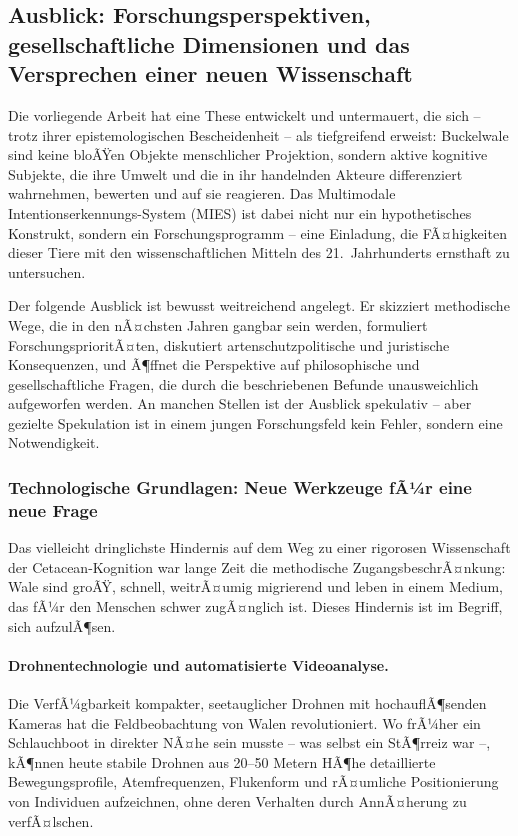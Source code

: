 ﻿\documentclass[12pt,a4paper]{article}
\theoremstyle{definition}
\theoremstyle{remark}
\begin{document}
\subsection{Ausblick: Forschungsperspektiven, gesellschaftliche Dimensionen und das Versprechen einer neuen Wissenschaft}
\label{sec:ausblick}

Die vorliegende Arbeit hat eine These entwickelt und untermauert, die sich -- trotz ihrer epistemologischen Bescheidenheit -- als tiefgreifend erweist: Buckelwale sind keine bloÃŸen Objekte menschlicher Projektion, sondern aktive kognitive Subjekte, die ihre Umwelt und die in ihr handelnden Akteure differenziert wahrnehmen, bewerten und auf sie reagieren. Das Multimodale Intentionserkennungs-System (MIES) ist dabei nicht nur ein hypothetisches Konstrukt, sondern ein Forschungsprogramm -- eine Einladung, die FÃ¤higkeiten dieser Tiere mit den wissenschaftlichen Mitteln des 21.\ Jahrhunderts ernsthaft zu untersuchen.

Der folgende Ausblick ist bewusst weitreichend angelegt. Er skizziert methodische Wege, die in den nÃ¤chsten Jahren gangbar sein werden, formuliert ForschungsprioritÃ¤ten, diskutiert artenschutzpolitische und juristische Konsequenzen, und Ã¶ffnet die Perspektive auf philosophische und gesellschaftliche Fragen, die durch die beschriebenen Befunde unausweichlich aufgeworfen werden. An manchen Stellen ist der Ausblick spekulativ -- aber gezielte Spekulation ist in einem jungen Forschungsfeld kein Fehler, sondern eine Notwendigkeit.

\subsubsection{Technologische Grundlagen: Neue Werkzeuge fÃ¼r eine neue Frage}

Das vielleicht dringlichste Hindernis auf dem Weg zu einer rigorosen Wissenschaft der Cetacean-Kognition war lange Zeit die methodische ZugangsbeschrÃ¤nkung: Wale sind groÃŸ, schnell, weitrÃ¤umig migrierend und leben in einem Medium, das fÃ¼r den Menschen schwer zugÃ¤nglich ist. Dieses Hindernis ist im Begriff, sich aufzulÃ¶sen.

\paragraph{Drohnentechnologie und automatisierte Videoanalyse.}
Die VerfÃ¼gbarkeit kompakter, seetauglicher Drohnen mit hochauflÃ¶senden Kameras hat die Feldbeobachtung von Walen revolutioniert. Wo frÃ¼her ein Schlauchboot in direkter NÃ¤he sein musste -- was selbst ein StÃ¶rreiz war --, kÃ¶nnen heute stabile Drohnen aus 20--50 Metern HÃ¶he detaillierte Bewegungsprofile, Atemfrequenzen, Flukenform und rÃ¤umliche Positionierung von Individuen aufzeichnen, ohne deren Verhalten durch AnnÃ¤herung zu verfÃ¤lschen.
\end{document}
